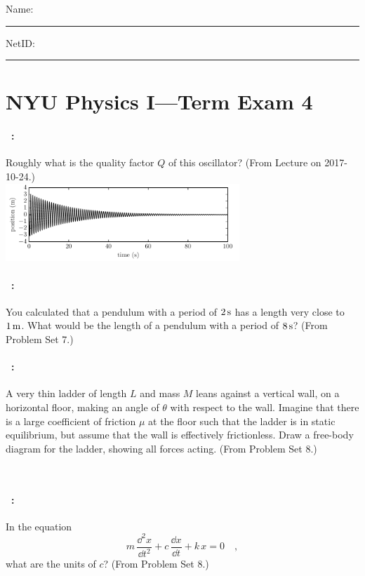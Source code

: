 \documentclass[12pt]{article} 
\begin{document}
\noindent
Name: \rule[-1ex]{0.55\textwidth}{0.1pt}
NetID: \rule[-1ex]{0.2\textwidth}{0.1pt}

\section*{NYU Physics I---Term Exam 4}

\paragraph{\problemname~\theproblem:}%
Roughly what is the quality factor $Q$ of this oscillator? (From
Lecture on 2017-10-24.) \\
\includegraphics[width=0.66\textwidth]{../py/damped_oscillation.pdf}

\vfill

\paragraph{\problemname~\theproblem:}%
You calculated that a pendulum with a period of $2\,\mathrm{s}$ has a length
very close to $1\,\mathrm{m}$. What would be the length of a pendulum with
a period of $8\,\mathrm{s}$? (From Problem Set 7.)

\vfill

\paragraph{\problemname~\theproblem:}%
A very thin ladder of length $L$ and mass $M$ leans against a
vertical wall, on a horizontal floor, making an angle of $\theta$ with respect to the
wall. Imagine that there is a large coefficient of friction $\mu$ at the floor such that
the ladder is in static equilibrium, but assume that the wall is effectively
frictionless. Draw a free-body diagram for the ladder, showing all forces acting.
(From Problem Set 8.)

\vfill
~
\clearpage

\paragraph{\problemname~\theproblem:}%
In the equation
$$
m\,\frac{\dd^2 x}{\dd t^2} + c\,\frac{\dd x}{\dd t} + k\,x = 0 \quad ,
$$ what are the units of $c$? (From Problem Set 8.)
\end{document}
